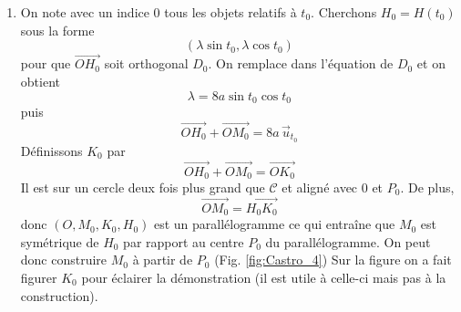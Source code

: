 \begin{enumerate}
\begin{enumerate}
\item  On note avec un indice 0 tous les objets relatifs {\`a} $t_{0}$.\newline
Cherchons $H_{0}=H(t_{0})$ sous la forme 
\begin{displaymath}
 (\lambda \sin t_{0},\lambda \cos t_{0})
\end{displaymath}
pour que $\overrightarrow{OH_0}$ soit orthogonal $D_0$. On remplace dans l'équation de $D_0$ et on obtient 
\begin{displaymath}
\lambda =8a\sin t_{0}\cos t_{0}
\end{displaymath}
puis
\begin{displaymath}
\overrightarrow{OH_{0}}+\overrightarrow{OM_{0}}=8a\,\overrightarrow{u}_{t_{0}}
\end{displaymath}
D{\'e}finissons $K_{0}$ par 
\begin{displaymath}
 \overrightarrow{OH_{0}}+\overrightarrow{OM_{0}}=\overrightarrow{OK_{0}}
\end{displaymath}
Il est sur un cercle deux fois plus grand que $\mathcal C$ et aligné avec $0$ et $P_0$. De plus,
\begin{displaymath}
 \overrightarrow{OM_{0}}=\overrightarrow{H_{0}K_{0}}
\end{displaymath}
donc $(O,M_{0},K_{0},H_{0})$ est un parall{\'e}logramme ce qui entraîne que $M_0$ est symétrique de $H_{0}$ par rapport au centre $P_{0}$ du parallélogramme.\newline
On peut donc construire $M_0$ à partir de $P_0$ (Fig. \ref{fig:Castro_4}) Sur la figure on a fait figurer $K_0$ pour éclairer la démonstration (il est utile à celle-ci mais pas à la construction).
\end{enumerate}
\end{enumerate}
